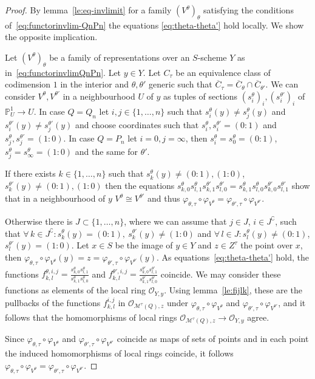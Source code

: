 \documentclass[10pt,a4paper]{amsart}
\theoremstyle{definition}
\def\phi{\varphi}
\def\P{\mathds P}
\def\O{\mathcal O}
\begin{document}
\begin{proof}
By lemma~\ref{le:eq-invlimit} for a family $(V^\theta)_\theta$ 
satisfying the conditions of~\eqref{eq:functorinvlim-QnPn} the equations 
\eqref{eq:theta-theta'} hold locally. We show the opposite implication.

Let $(V^\theta)_\theta$ be a family of representations over an $S$-scheme $Y$
as in~\eqref{eq:functorinvlimQnPn}. Let $y\in Y$. 
Let $C_\tau$ be an equivalence class of codimension $1$ in the interior 
and $\theta,\theta'$ generic such that
$\overline{C}_\tau=\overline{C}_\theta\cap\overline{C}_{\theta'}$.
We can consider $V^\theta,V^{\theta'}$ in a neighbourhood $U$ of $y$ as tuples of 
sections $(s^\theta_i)_i,(s^{\theta'}_i)_i$ of $\P^1_U\to U$.
In case $Q=Q_n$ let $i,j\in\{1,\ldots,n\}$ such that $s^\theta_i(y)\neq s^\theta_j(y)$ 
and $s^{\theta'}_i(y)\neq s^{\theta'}_j(y)$ and choose coordinates such that 
$s^\theta_i,s^{\theta'}_i=(0:1)$ and $s^\theta_j,s^{\theta'}_j=(1:0)$. 
In case $Q=P_n$ let $i=0,j=\infty$, then $s^\theta_i=s^\theta_0=(0:1)$, %
$s^\theta_j=s^\theta_\infty=(1:0)$ and the same for $\theta'$.

If there exists $k\in\{1,\ldots,n\}$ such that $s^\theta_k(y)\neq(0:1),(1:0)$,
$s^{\theta'}_k(y)\neq(0:1),(1:0)$ then the equations 
$s^\theta_{k,0}s^\theta_{l,1}s^{\theta'}_{k,1}s^{\theta'}_{l,0}
=s^\theta_{k,1}s^\theta_{l,0}s^{\theta'}_{k,0}s^{\theta'}_{l,1}$
show that in a neighbourhood of $y$ $V^\theta\cong V^{\theta'}$ and thus
$\phi_{\theta,\tau}\circ\phi_{V^\theta}=\phi_{\theta',\tau}\circ\phi_{V^{\theta'}}$.

Otherwise there is $J\subset\{1,\ldots,n\}$, where we can assume that $j\in J$,
$i\in J^\complement$, such that 
$\forall\,k\in J^\complement\colon s^\theta_k(y)=(0:1),\:s^{\theta'}_k(y)\neq(1:0)$ 
and $\forall\,l\in J\colon s^\theta_l(y)\neq (0:1)$, $s^{\theta'}_l(y)=(1:0)$.
Let $x\in S$ be the image of $y\in Y$ and $z\in Z^\tau$ the point over $x$, then 
$\phi_{\theta,\tau}\circ\phi_{V^\theta}(y)=z=\phi_{\theta',\tau}
\circ\phi_{V^{\theta'}}(y)$.
As equations~\eqref{eq:theta-theta'} hold, the functions
$f^{\theta,i,j}_{k,l}=\frac{s^\theta_{k,0}s^\theta_{l,1}}{s^\theta_{k,1}s^\theta_{l,0}}$ 
and $f^{\theta'\!,i,j}_{k,l}=\frac{s^{\theta'}_{k,0}s^{\theta'}_{l,1}}
{s^{\theta'}_{k,1}s^{\theta'}_{l,0}}$ coincide. We may consider these functions 
as elements of the local ring $\O_{Y,y}$.
Using lemma~\ref{le:fijlk}, these are the pullbacks of the functions $f^{i,j}_{k,l}$ 
in $\O_{\mathcal M^\tau(Q),z}$ under $\phi_{\theta,\tau}\circ\phi_{V^\theta}$ and
$\phi_{\theta',\tau}\circ\phi_{V^{\theta'}}$, and it follows that the homomorphisms 
of local rings $\O_{\mathcal M^\tau(Q),z}\to\O_{Y,y}$ agree.

Since $\phi_{\theta,\tau}\circ\phi_{V^\theta}$ and 
$\phi_{\theta',\tau}\circ\phi_{V^{\theta'}}$ coincide as maps of sets of points and 
in each point the induced homomorphisms of local rings coincide, it follows
$\phi_{\theta,\tau}\circ\phi_{V^\theta}=\phi_{\theta',\tau}\circ\phi_{V^{\theta'}}$.
\end{proof}
\end{document}
